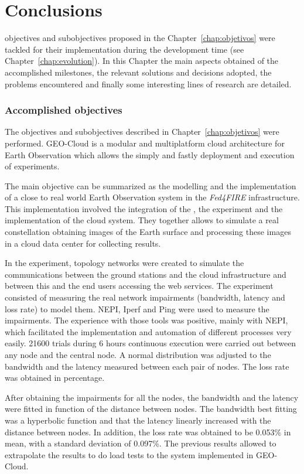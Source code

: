\chapter{Conclusions}
\label{chap:conclusions}
 objectives and subobjectives proposed in the
Chapter~\ref{chap:objetivos} were tackled for their implementation during the
development time (see Chapter~\ref{chap:evolution}). In this Chapter the main
aspects obtained of the accomplished milestones, the relevant solutions and
decisions adopted, the problems encountered and finally some interesting lines
of research are detailed.

\subsection{Accomplished objectives}

The objectives and subobjectives described in Chapter~\ref{chap:objetivos} were
performed. GEO-Cloud is a modular and multiplatform cloud architecture for Earth Observation  which allows the simply and fastly deployment and
execution of  experiments.

The main objective can be summarized as the modelling and the implementation of
a close to real world Earth Observation system in the \emph{Fed4FIRE} infrastructure.
This implementation involved  the integration of the \sss, the \pl
experiment and the implementation of the cloud system. They together allows to
simulate a real constellation obtaining images of the Earth surface and
processing these images in a cloud data center for collecting results.


In the \pl experiment, topology networks were created to simulate
the communications between the ground stations and the cloud
infrastructure and between this and the end users accessing
the web services. The experiment consisted of measuring the
real network impairments (bandwidth, latency and loss rate)
to model them. NEPI, Iperf and Ping were used to measure
the impairments. The experience with those tools was positive,
mainly with NEPI, which facilitated the implementation and
automation of different processes very easily.
21600 trials during 6 hours continuous execution were
carried out between any node and the central node. A normal
distribution was adjusted to the bandwidth and the latency
measured between each pair of nodes. The loss rate was
obtained in percentage.

After obtaining the impairments for all the nodes, the
bandwidth and the latency were fitted in function of the
distance between nodes. The bandwidth best fitting was a
hyperbolic function and that the latency linearly increased with
the distance between nodes. In addition, the loss rate was
obtained to be 0.053\% in mean, with a standard deviation of
0.097\%. The previous results allowed to extrapolate the
results to do load tests to the system implemented in GEO-Cloud.

